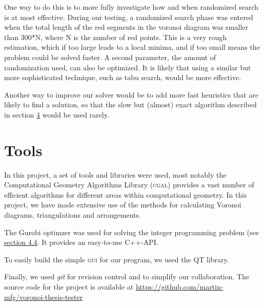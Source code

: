 \documentclass[a4paper,12pt]{article}
\begin{document}
One way to do this is to more fully investigate how and when randomized search is at most effective. During our testing, a randomized search phase was entered when the total length of the red segments in the voronoi diagram was smaller than 300*N, where N is the number of red points. This is a very rough estimation, which if too large leads to a local minima, and if too small means the problem could be solved faster. A second parameter, the amount of randomization used, can also be optimized. It is likely that using a similar but more sophisticated technique, such as tabu search, would be more effective.

Another way to improve our solver would be to add more fast heuristics that are likely to find a solution, so that the slow but (almost) exact algorithm described in section \hyperref[sec:findPoints]{4} would be used rarely.

\section{Tools}
In this project, a set of tools and libraries were used, most notably the Computational Geometry Algorithms Library (\textsc{cgal}) provides a vast number of efficient algorithms for different areas within computational geometry. In this project, we have made extensive use of the methods for calculating Voronoi diagrams, triangulations and arrangements.

The Gurobi optimzer was used for solving the integer programming problem (see  \hyperref[sec:gurobi]{section 4.4}. It provides an easy-to-use C++-\textsc{API}.

To easily build the simple \textsc{gui} for our program, we used the \textsc{QT} library.

Finally, we used \emph{git} for revision control and to simplify our collaboration. The source code for the project is available at \newline 
\url{https://github.com/martin-mfg/voronoi-thesis-tester}
\newpage
\end{document}
